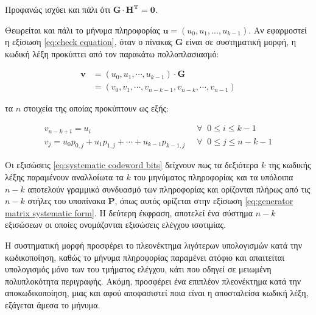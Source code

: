 \vspace{5mm}
Προφανώς ισχύει και πάλι ότι $\mathbf{G}\cdot\mathbf{H^T}=\mathbf{0}$.

Θεωρείται και πάλι το μήνυμα πληροφορίας $\mathbf{u} = (u_0, u_1, ..., u_{k-1})$. Αν εφαρμοστεί η εξίσωση \ref{eq:check equation}, όταν ο πίνακας $\mathbf{G}$ είναι σε συστηματική μορφή, η κωδική λέξη προκύπτει από τον παρακάτω πολλαπλασιασμό:

\begin{equation}
\begin{split}
\mathbf{v} & = \left( u_0, u_1, \cdots, u_{k-1} \right) \cdot \mathbf{G}\\
& = \left( v_0, v_1, \cdots, v_{n-k-1}, v_{n-k}, \cdots, v_{n-1} \right)
\end{split}
\label{eq:systematic codeword formation}
\end{equation}

\vspace{5mm}

τα $n$ στοιχεία της οποίας προκύπτουν ως εξής:

\begin{equation}
\begin{aligned}
v_{n-k+i}=u_i\;\;\ & \forall\;\;0\leq i \leq k-1  \\
v_j=u_0p_{0,j}+u_1p_{1,j}+\cdots+u_{k-1}p_{k-1,j}\;\; & \forall\;\;0\leq j \leq n-k-1
\end{aligned}
\label{eq:systematic codeword bits}
\end{equation}

\vspace{5mm}

Οι εξισώσεις \ref{eq:systematic codeword bits} δείχνουν πως τα δεξιότερα $k$  της κωδικής λέξης παραμένουν αναλλοίωτα τα $k$  του μηνύματος πληροφορίας και τα υπόλοιπα $n-k$ αποτελούν γραμμικό συνδυασμό των  πληροφορίας και ορίζονται πλήρως από τις $n-k$ στήλες του υποπίνακα $\mathbf{P}$, όπως αυτός ορίζεται στην εξίσωση \ref{eq:generator matrix systematic form}. Η δεύτερη έκφραση, αποτελεί ένα σύστημα $n-k$ εξισώσεων οι οποίες ονομάζονται εξισώσεις ελέγχου ισοτιμίας.

Η συστηματική μορφή προσφέρει το πλεονέκτημα λιγότερων υπολογισμών κατά την κωδικοποίηση, καθώς το μήνυμα πληροφορίας παραμένει ατόφιο και 
απαιτείται υπολογισμός μόνο των  του τμήματος ελέγχου, κάτι που οδηγεί σε μειωμένη πολυπλοκότητα περιγραφής. Ακόμη, προσφέρει ένα επιπλέον πλεονέκτημα κατά την αποκωδικοποίηση, μιας και αφού αποφασιστεί ποια είναι η αποσταλείσα κωδική λέξη, εξάγεται άμεσα το μήνυμα.

